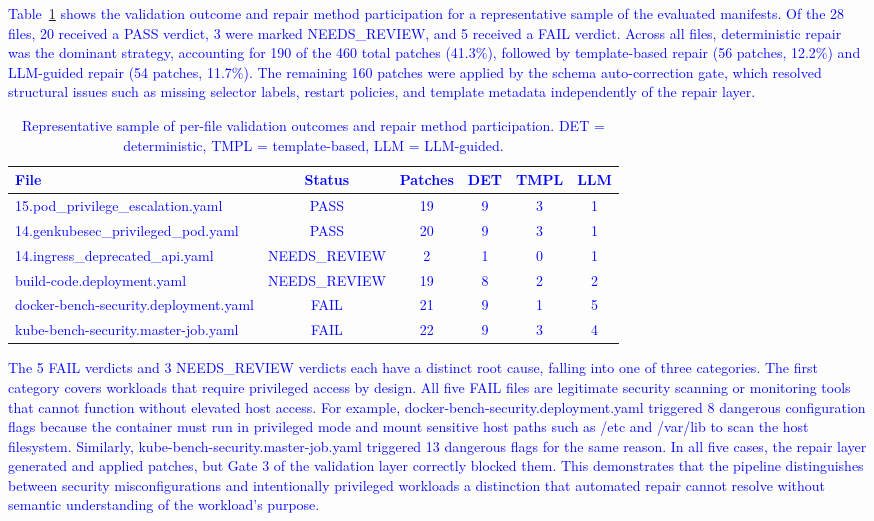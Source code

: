 \documentclass[preprint,12pt]{elsarticle}
\newcommand{\new}[1]{\textcolor{blue}{#1}}
\newcommand{\safefixtablestyle}{%
  \small
  \setlength{\tabcolsep}{5pt}
  \renewcommand{\arraystretch}{1.15}
}
\begin{document}
\new{
Table~\ref{tab:perfile-breakdown} shows the validation outcome 
and repair method participation for a representative sample of the evaluated manifests. Of the 28 files, 20 received a PASS verdict, 
3 were marked NEEDS\_REVIEW, and 5 received a FAIL verdict. Across 
all files, deterministic repair was the dominant strategy, accounting 
for 190 of the 460 total patches (41.3\%), followed by template-based 
repair (56 patches, 12.2\%) and LLM-guided repair (54 patches, 11.7\%). 
The remaining 160 patches were applied by the schema auto-correction gate, 
which resolved structural issues such as missing selector labels, restart 
policies, and template metadata independently of the repair layer.}
\new{
\begin{table}[htbp]
\centering
\caption{Representative sample of per-file validation outcomes and 
repair method participation. DET = deterministic, TMPL = template-based, 
LLM = LLM-guided.}
\label{tab:perfile-breakdown}
\safefixtablestyle
\scriptsize
\setlength{\tabcolsep}{4pt}
\begin{tabular}{@{} l c c c c c @{}}
\toprule
\textbf{File} & \textbf{Status} & \textbf{Patches} &
\textbf{DET} & \textbf{TMPL} & \textbf{LLM} \\
\midrule
15.pod\_privilege\_escalation.yaml                    & PASS          & 19 &  9 & 3 & 1 \\
14.genkubesec\_privileged\_pod.yaml   & PASS          & 20 &  9 & 3 & 1 \\
14.ingress\_deprecated\_api.yaml      & NEEDS\_REVIEW &  2 &  1 & 0 & 1 \\
build-code.deployment.yaml            & NEEDS\_REVIEW & 19 &  8 & 2 & 2 \\
docker-bench-security.deployment.yaml & FAIL          & 21 &  9 & 1 & 5 \\
kube-bench-security.master-job.yaml   & FAIL          & 22 &  9 & 3 & 4 \\
\bottomrule
\end{tabular}
\end{table}
}
\new{
The 5 FAIL verdicts and 3 NEEDS\_REVIEW verdicts each have a 
distinct root cause, falling into one of three categories. }
\new{
The first category covers workloads that require privileged access 
by design. All five FAIL files are legitimate security scanning or 
monitoring tools that cannot function without elevated host access. 
For example, docker-bench-security.deployment.yaml triggered 8 
dangerous configuration flags because the container must run in 
privileged mode and mount sensitive host paths such as /etc and 
/var/lib to scan the host filesystem. Similarly, 
kube-bench-security.master-job.yaml triggered 13 dangerous flags 
for the same reason. In all five cases, the repair layer generated 
and applied patches, but Gate 3 of the validation layer correctly 
blocked them. This demonstrates that the pipeline distinguishes 
between security misconfigurations and intentionally privileged 
workloads a distinction that automated repair cannot resolve 
without semantic understanding of the workload's purpose. }
\end{document}
